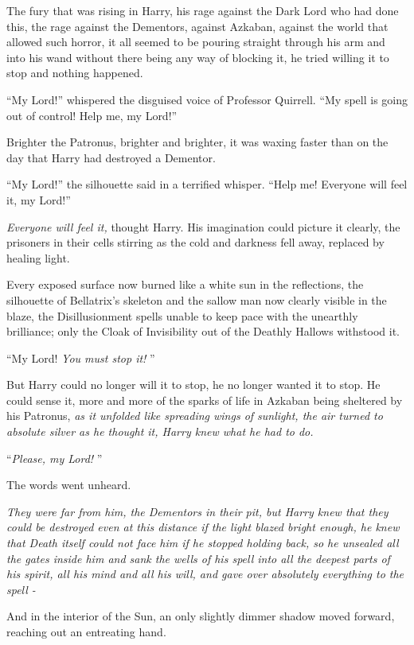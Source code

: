 The fury that was rising in Harry, his rage against the Dark Lord who
had done this, the rage against the Dementors, against Azkaban, against
the world that allowed such horror, it all seemed to be pouring straight
through his arm and into his wand without there being any way of
blocking it, he tried willing it to stop and nothing happened.

``My Lord!'' whispered the disguised voice of Professor Quirrell. ``My
spell is going out of control! Help me, my Lord!''

Brighter the Patronus, brighter and brighter, it was waxing faster than
on the day that Harry had destroyed a Dementor.

``My Lord!'' the silhouette said in a terrified whisper. ``Help me!
Everyone will feel it, my Lord!''

\emph{Everyone will feel it,} thought Harry. His imagination could
picture it clearly, the prisoners in their cells stirring as the cold
and darkness fell away, replaced by healing light.

Every exposed surface now burned like a white sun in the reflections,
the silhouette of Bellatrix's skeleton and the sallow man now clearly
visible in the blaze, the Disillusionment spells unable to keep pace
with the unearthly brilliance; only the Cloak of Invisibility out of the
Deathly Hallows withstood it.

``My Lord! \emph{You must stop it!} ''

But Harry could no longer will it to stop, he no longer wanted it to
stop. He could sense it, more and more of the sparks of life in Azkaban
being sheltered by his Patronus, \emph{as it unfolded like spreading
wings of sunlight, the air turned to absolute silver as he thought it,
Harry knew what he had to do.}

``\emph{Please, my Lord!} ''

The words went unheard.

\emph{They were far from him, the Dementors in their pit, but Harry knew
that they could be destroyed even at this distance if the light blazed
bright enough, he knew that Death itself could not face him if he
stopped holding back, so he unsealed all the gates inside him and sank
the wells of his spell into all the deepest parts of his spirit, all his
mind and all his will, and gave over absolutely everything to the spell
-}

And in the interior of the Sun, an only slightly dimmer shadow moved
forward, reaching out an entreating hand.

